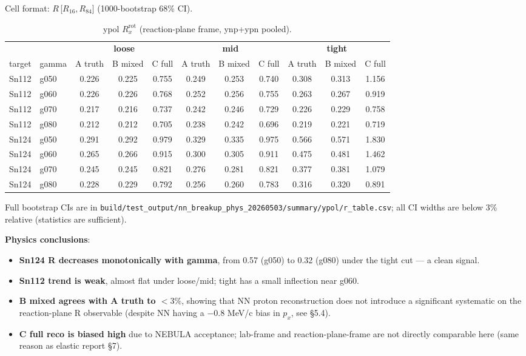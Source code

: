 \documentclass[a4paper,11pt]{article}
\begin{document}
Cell format: $R$\,[$R_{16}, R_{84}$] (1000-bootstrap 68\% CI).

\begin{table}[H]
\centering\scriptsize
\caption{ypol $R_x^\text{rot}$ (reaction-plane frame, ynp+ypn pooled).}
\begin{tabular}{ll|ccc|ccc|ccc}
\toprule
& & \multicolumn{3}{c|}{\textbf{loose}} & \multicolumn{3}{c|}{\textbf{mid}} & \multicolumn{3}{c}{\textbf{tight}} \\
target & gamma & A truth & B mixed & C full & A truth & B mixed & C full & A truth & B mixed & C full \\
\midrule
Sn112 & g050 & 0.226 & 0.225 & 0.755 & 0.249 & 0.253 & 0.740 & 0.308 & 0.313 & 1.156 \\
Sn112 & g060 & 0.226 & 0.226 & 0.768 & 0.252 & 0.256 & 0.755 & 0.263 & 0.267 & 0.919 \\
Sn112 & g070 & 0.217 & 0.216 & 0.737 & 0.242 & 0.246 & 0.729 & 0.226 & 0.229 & 0.758 \\
Sn112 & g080 & 0.212 & 0.212 & 0.705 & 0.238 & 0.242 & 0.696 & 0.219 & 0.221 & 0.719 \\
Sn124 & g050 & 0.291 & 0.292 & 0.979 & 0.329 & 0.335 & 0.975 & 0.566 & 0.571 & 1.830 \\
Sn124 & g060 & 0.265 & 0.266 & 0.915 & 0.300 & 0.305 & 0.911 & 0.475 & 0.481 & 1.462 \\
Sn124 & g070 & 0.245 & 0.245 & 0.821 & 0.276 & 0.281 & 0.821 & 0.377 & 0.381 & 1.079 \\
Sn124 & g080 & 0.228 & 0.229 & 0.792 & 0.256 & 0.260 & 0.783 & 0.316 & 0.320 & 0.891 \\
\bottomrule
\end{tabular}
\end{table}

Full bootstrap CIs are in \texttt{build/test\_output/nn\_breakup\_phys\_20260503/summary/ypol/r\_table.csv}; all CI widths are below 3\% relative (statistics are sufficient).

\textbf{Physics conclusions}:
\begin{itemize}[nosep]
    \item \textbf{Sn124 R decreases monotonically with gamma}, from 0.57 (g050) to 0.32 (g080) under the tight cut --- a clean signal.
    \item \textbf{Sn112 trend is weak}, almost flat under loose/mid; tight has a small inflection near g060.
    \item \textbf{B mixed agrees with A truth to $<3\%$}, showing that NN proton reconstruction does not introduce a significant systematic on the reaction-plane R observable (despite NN having a $-0.8$ MeV/c bias in $p_x$, see \S5.4).
    \item \textbf{C full reco is biased high} due to NEBULA acceptance; lab-frame and reaction-plane-frame are not directly comparable here (same reason as elastic report \S7).
\end{itemize}
\end{document}
